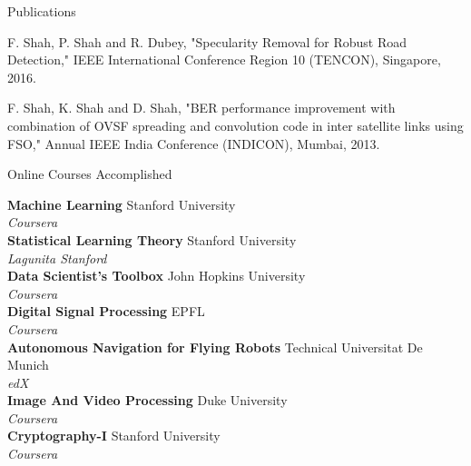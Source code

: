 \documentclass{resume} %
\begin{document}

	\begin{rSection}{Publications}
		\item F. Shah, P. Shah and R. Dubey, "Specularity Removal for Robust Road Detection," IEEE International Conference Region 10 (TENCON), Singapore, 2016.
		\item F. Shah, K. Shah and D. Shah, "BER performance improvement with combination of OVSF spreading and convolution code in inter satellite links using FSO," Annual IEEE India Conference (INDICON), Mumbai, 2013.
		\end{rSection}
	
	\begin{rSection}{Online Courses Accomplished}
		
		\textbf{Machine Learning} \hfill {Stanford University}\\
		\textit{Coursera}
		\vspace{0.1 in}
		\\
		\textbf{Statistical Learning Theory} \hfill{Stanford University}\\
		\textit{Lagunita Stanford}
		\vspace{0.1 in}
		\\
		\textbf{Data Scientist's Toolbox} \hfill {John Hopkins University}\\
		\textit{Coursera}
		\vspace{0.1 in}
		\\
		\textbf{Digital Signal Processing} \hfill{EPFL}\\
		\textit{Coursera}
		\vspace{0.1 in}
		\\
		\textbf{Autonomous Navigation for Flying Robots} \hfill{Technical Universitat De Munich}\\
		\textit{edX}
		\vspace{0.1 in}
		\\
		\textbf{Image And Video Processing} \hfill {Duke University}\\
		\textit{Coursera}
		\vspace{0.1 in}
		\\
	\textbf{Cryptography-I} \hfill {Stanford University}\\
	\textit{Coursera}
	\vspace{0.1 in}	
		\end{rSection}
		
\end{document}
